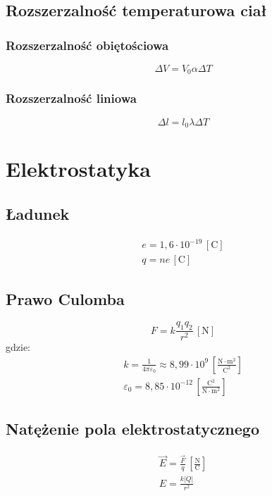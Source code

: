 \documentclass{article}
\numberwithin{equation}{section}
\newcommand{\unit}[1]{\, \left[\mathrm{#1}\right]}
\begin{document}
    \subsection{Rozszerzalność temperaturowa ciał}
      \subsubsection{Rozszerzalność obiętościowa}
        \begin{equation}
          \Delta V = V_0\alpha\Delta T
        \end{equation}
      \subsubsection{Rozszerzalność liniowa}
        \begin{equation}
          \Delta l = l_0\lambda\Delta T
        \end{equation}

  \newpage
  \section{Elektrostatyka}
    \subsection{Ładunek}
      \begin{gather}
        e = 1,6\cdot 10^{-19} \unit{C}\\
        q = ne \unit{C}
      \end{gather}
    \subsection{Prawo Culomba}
      \begin{equation}
        F = k\frac{q_1q_2}{r^2} \unit{N}
      \end{equation}
      gdzie:
      \begin{gather}
        k = \frac{1}{4\pi\varepsilon_0} \approx 8,99\cdot 10^9 \unit{\frac{N\cdot m^2}{C^2}}\\
        \varepsilon_0 = 8,85\cdot 10^{-12} \unit{\frac{C^2}{N\cdot m^2}}
      \end{gather}
    \subsection{Natężenie pola elektrostatycznego}
      \begin{gather}
        \vec E = \frac{\vec F}{q} \unit{\frac{N}{C}}\\
        E = \frac{k|Q|}{r^2}
      \end{gather}
\end{document}
